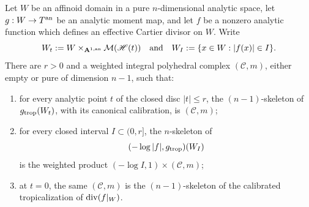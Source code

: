
\begin{lemma}
\label{lem:ch18-fibre-cylinder}
Let $W$ be an affinoid domain in a pure $n$-dimensional analytic space,
let $g:W\to T^{\mathrm{an}}$ be an analytic moment map, and let $f$ be a nonzero
analytic function which defines an effective Cartier divisor on $W$.
Write
\[
 W_t:=W\mathbin{\times}_{\mathbf A^{1,\mathrm{an}}}\mathcal M(\mathscr H(t))
 \quad\text{and}\quad
 W_I:=\{x\in W:|f(x)|\in I\}.
\]
There are $r>0$ and a weighted integral polyhedral complex
$(\mathscr C,m)$, either empty or pure of dimension $n-1$, such that:
\begin{enumerate}
\item for every analytic point $t$ of the closed disc $|t|\leq r$, the
 $(n-1)$-skeleton of $g_{\mathrm{trop}}(W_t)$, with its canonical calibration, is
 $(\mathscr C,m)$;
\item for every closed interval $I\subset(0,r]$, the $n$-skeleton of
 \[
              (-\log|f|,g_{\mathrm{trop}})(W_I)
 \]
 is the weighted product $(-\log I,1)\times(\mathscr C,m)$;
\item at $t=0$, the same $(\mathscr C,m)$ is the $(n-1)$-skeleton of the
 calibrated tropicalization of $\operatorname{div}(f|_W)$.
\end{enumerate}
\end{lemma}


